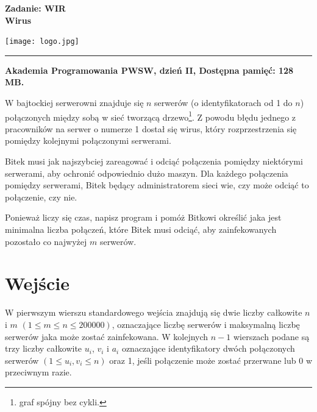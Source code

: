 \documentclass[10pt]{article}
\begin{document}
    

    \noindent
    \begin{minipage}{0.5\textwidth}
        \LARGE{\textsf{\textbf{Zadanie: WIR\\Wirus}}}
    \end{minipage}
    \begin{minipage}{0.5\textwidth}
        \begin{flushright}
            \texttt{[image: logo.jpg]}
        \end{flushright}
    \end{minipage}
    
    \noindent\rule{\textwidth}{0.4pt}
    
    \noindent\textbf{Akademia Programowania PWSW, dzień II, Dostępna pamięć: 128 MB.}
    \vspace{1em}
    
    
    \noindent
    W bajtockiej serwerowni znajduje się $n$ serwerów (o identyfikatorach od 1 do $n$) połączonych między sobą w sieć tworzącą drzewo\footnote{graf spójny bez cykli.}. Z powodu błędu jednego z pracowników na serwer o numerze 1 dostał się wirus, który rozprzestrzenia się pomiędzy kolejnymi połączonymi serwerami. 

    Bitek musi jak najszybciej zareagować i odciąć połączenia pomiędzy niektórymi serwerami, aby ochronić odpowiednio dużo maszyn. Dla każdego połączenia pomiędzy serwerami, Bitek będący administratorem sieci wie, czy może odciąć to połączenie, czy nie. 
    
    Ponieważ liczy się czas, napisz program i pomóż Bitkowi określić jaka jest minimalna liczba połączeń, które Bitek musi odciąć, aby zainfekowanych pozostało co najwyżej $m$ serwerów.


    \section*{Wejście}
    
    W pierwszym wierszu standardowego wejścia znajdują się dwie liczby całkowite $n$ i $m$ $(1\leq m\leq n\leq 200000)$, oznaczające liczbę serwerów i maksymalną liczbę serwerów jaka może zostać zainfekowana. W kolejnych $n-1$ wierszach podane są trzy liczby całkowite $u_{i}$, $v_{i}$ i $a_{i}$ oznaczające identyfikatory dwóch połączonych serwerów $(1 \leq u_{i}, v_{i} \leq n)$ oraz 1, jeśli połączenie może zostać przerwane lub 0 w przeciwnym razie.
\end{document}
